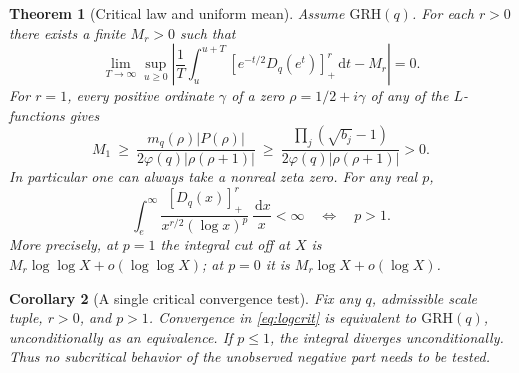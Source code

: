 \documentclass[11pt]{article}
\newtheorem{theorem}{Theorem}[section]
\newtheorem{corollary}[theorem]{Corollary}
\newcommand{\pp}[1]{[#1]_+}
\newcommand{\dd}{\,\mathrm d}
\newcommand{\GRH}{\mathrm{GRH}}
\begin{document}
\begin{theorem}[Critical law and uniform mean]\label{thm:critical}
Assume $\GRH(q)$. For each $r>0$ there exists a finite $M_r>0$ such that
\begin{equation}\label{eq:mean}
 \lim_{T\to\infty}\sup_{u\ge0}\left|\frac1T\int_u^{u+T}\pp{e^{-t/2}D_q(e^t)}^r\dd t-M_r\right|=0.
\end{equation}
For $r=1$, every positive ordinate $\gamma$ of a zero $\rho=1/2+i\gamma$ of any of the $L$-functions gives
\begin{equation}\label{eq:lower}
 M_1\ \ge\ \frac{m_q(\rho)|P(\rho)|}{2\varphi(q)|\rho(\rho+1)|}\ \ge\ \frac{\prod_j(\sqrt{b_j}-1)}{2\varphi(q)|\rho(\rho+1)|}>0.
\end{equation}
In particular one can always take a nonreal zeta zero. For any real $p$,
\begin{equation}\label{eq:logcrit}
 \int_e^\infty \frac{\pp{D_q(x)}^r}{x^{r/2}(\log x)^p}\,\frac{\dd x}{x}<\infty
 \quad\Longleftrightarrow\quad p>1.
\end{equation}
More precisely, at $p=1$ the integral cut off at $X$ is $M_r\log\log X+o(\log\log X)$; at $p=0$ it is $M_r\log X+o(\log X)$.
\end{theorem}

\begin{corollary}[A single critical convergence test]\label{cor:test}
Fix any $q$, admissible scale tuple, $r>0$, and $p>1$. Convergence in \eqref{eq:logcrit} is equivalent to $\GRH(q)$, unconditionally as an equivalence. If $p\le1$, the integral diverges unconditionally. Thus no subcritical behavior of the unobserved negative part needs to be tested.
\end{corollary}
\end{document}
